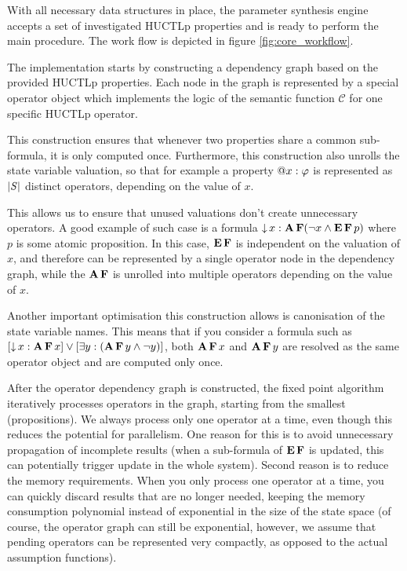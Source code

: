 With all necessary data structures in place, the parameter synthesis engine accepts a set of investigated \ac{HUCTLp} properties and is ready to perform the main procedure. The work flow is depicted in figure \ref{fig:core_workflow}.

The implementation starts by constructing a dependency graph based on the provided \ac{HUCTLp} properties. Each node in the graph is represented by a special operator object which implements the logic of the semantic function $\mathcal{C}$ for one specific \ac{HUCTLp} operator. 

This construction ensures that whenever two properties share a common sub-formula, it is only computed once. Furthermore, this construction also unrolls the state variable valuation, so that for example a property $\operatorname{@\!} x : \varphi$ is represented as $|\mathit{S}|$ distinct operators, depending on the value of $x$. 


This allows us to ensure that unused valuations don't create unnecessary operators. A good example of such case is a formula $\operatorname{\downarrow} x : \operatorname{\mathbf{A}}\operatorname{\mathbf{F}} (\neg x \land \operatorname{\mathbf{E}}\operatorname{\mathbf{F}} p)$ where $p$ is some atomic proposition. In this case, $\operatorname{\mathbf{E}}\operatorname{\mathbf{F}}$ is independent on the valuation of $x$, and therefore can be represented by a single operator node in the dependency graph, while the $\operatorname{\mathbf{A}}\operatorname{\mathbf{F}}$ is unrolled into multiple operators depending on the value of $x$.

Another important optimisation this construction allows is canonisation of the state variable names. This means that if you consider a formula such as $[\operatorname{\downarrow} x : \operatorname{\mathbf{A}}\operatorname{\mathbf{F}} x] \lor [\exists y : (\operatorname{\mathbf{A}} \operatorname{\mathbf{F}} y \land \neg y)]$, both $\operatorname{\mathbf{A}}\operatorname{\mathbf{F}} x$ and $\operatorname{\mathbf{A}}\operatorname{\mathbf{F}} y$ are resolved as the same operator object and are computed only once. 

After the operator dependency graph is constructed, the fixed point algorithm iteratively processes operators in the graph, starting from the smallest (propositions). We always process only one operator at a time, even though this reduces the potential for parallelism. One reason for this is to avoid unnecessary propagation of incomplete results (when a sub-formula of $\operatorname{\mathbf{E}}\operatorname{\mathbf{F}}$ is updated, this can potentially trigger update in the whole system). Second reason is to reduce the memory requirements. When you only process one operator at a time, you can quickly discard results that are no longer needed, keeping the memory consumption polynomial instead of exponential in the size of the state space (of course, the operator graph can still be exponential, however, we assume that pending operators can be represented very compactly, as opposed to the actual assumption functions).  

